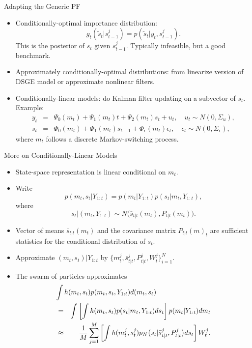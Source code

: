 \documentclass[presentation]{beamer}
\newcommand{\be}{\begin{equation}}
\newcommand{\ee}{\end{equation}}
\newcommand{\spitem}{\vspace{.3cm}\item}
\begin{document}
\begin{frame}[label={sec:org1de14f3}]{Adapting the Generic PF}
\begin{itemize}
	\spitem Conditionally-optimal importance distribution:
		\[
		   g_t(\tilde{s}_t|s^j_{t-1}) = p(\tilde{s}_t|y_t,s_{t-1}^j).
		\]
		This is the posterior of $s_t$ given $s_{t-1}^j$. Typically infeasible, but a 
		good benchmark.
	\spitem Approximately conditionally-optimal distributions: from linearize version
		of DSGE model or approximate nonlinear filters.
	\spitem Conditionally-linear models: do Kalman filter updating on a subvector of $s_t$. Example:
	\begin{eqnarray*}
	y_t &=& \Psi_0(m_t) + \Psi_1(m_t) t + \Psi_2(m_t) s_t + u_t, \quad u_t \sim N(0,\Sigma_u), \label{eq_pfsslinearms} \\
	s_t &=& \Phi_0(m_t) + \Phi_1(m_t)s_{t-1} + \Phi_\epsilon(m_t) \epsilon_t, \quad \epsilon_t \sim N(0,\Sigma_\epsilon), \nonumber
	\end{eqnarray*}
	where $m_t$ follows a discrete Markov-switching process.
\end{itemize}
\end{frame}


\begin{frame}[label={sec:org3b38f33}]{More on Conditionally-Linear Models}
	\begin{itemize}
		\item State-space representation is linear conditional on $m_t$.
        \spitem Write
\be
p(m_{t},s_{t}|Y_{1:t}) = p(m_{t}|Y_{1:t})p(s_{t}|m_{t},Y_{1:t}),
\ee
where
\be
s_t|(m_t,Y_{1:t}) \sim N \big( \bar{s}_{t|t}(m_t), P_{t|t}(m_t) \big).
\ee
\item Vector of means $\bar{s}_{t|t}(m_t)$ and the covariance matrix
$P_{t|t}(m)_t$ are sufficient statistics for the conditional distribution of $s_t$.
\item Approximate $(m_t,s_t)|Y_{1:t}$ by $\{m_{t}^j,\bar{s}_{t|t}^j,P_{t|t}^j,W_t^j\}_{i=1}^N$. 
\item The swarm of particles approximates
\begin{eqnarray}
\lefteqn{\int h(m_{t},s_{t}) p(m_t,s_t,Y_{1:t}) d(m_t,s_t)} \\
&=& \int \left[ \int h(m_{t},s_{t}) p(s_{t}|m_{t},Y_{1:t}) d s_{t} \right] p(m_{t}|Y_{1:t}) dm_{t} \label{eq_pfraoapproxtt} \nonumber \\
&\approx&
\frac{1}{M} \sum_{j=1}^M \left[ \int h(m_{t}^j,s_{t}^j) p_N\big(s_t|\bar{s}_{t|t}^j,P_{t|t}^j \big) ds_t \right] W_t^j. \nonumber
\end{eqnarray}
\end{itemize}
\end{frame}
\end{document}
